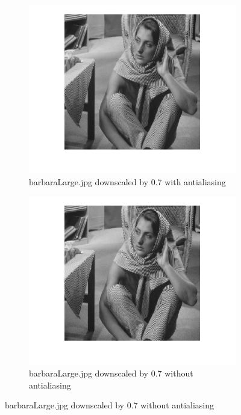 \documentclass{article}
\begin{document}
\begin{figure}
\begin{subfigure}[b]{0.4\linewidth}
    \end{subfigure}
    \begin{subfigure}[b]{0.4\linewidth}
        \centering
        \includegraphics[width=\linewidth]{barb07aa.png}
        \caption{barbaraLarge.jpg downscaled by 0.7 with antialiasing}
    \end{subfigure}
    \begin{subfigure}[b]{0.4\linewidth}
        \centering
        \includegraphics[width=\linewidth]{barb07noaa.png}
        \caption{barbaraLarge.jpg downscaled by 0.7 without antialiasing}
    \end{subfigure}

\end{figure}
\end{document}
